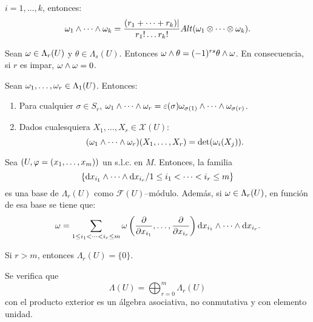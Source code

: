 \documentclass[cursovd_portada.tex]{subfiles}
\begin{document}
$i=1,\dots ,k$, entonces:
$$\omega_1\wedge\cdots\wedge\omega_k=\frac{(r_1+\cdots +r_k)|}{r_1!\dots r_k!}Alt(\omega_1\otimes\cdots\otimes\omega_k).$$
\begin{prop}
Sean $\omega\in\Lambda_r(U)$ y $\theta\in\Lambda_s(U)$. Entonces $\omega\wedge\theta=(-1)^{rs}\theta\wedge\omega$. En
consecuencia, si $r$ es impar, $\omega\wedge\omega=0$.
\end{prop}
\begin{prop}
Sean $\omega_1,\dots ,\omega_r\in\Lambda_1(U)$. Entonces:
\begin{enumerate}
\item Para cualquier $\sigma\in S_r$, $\omega_1\wedge\cdots\wedge\omega_r=\varepsilon(\sigma)\omega_{\sigma(1)}\wedge\cdots
\wedge\omega_{\sigma(r)}$.
\item Dados cualesquiera $X_1,\dots ,X_r\in\mathcal{X}(U)$:
$$(\omega_1\wedge\cdots\wedge\omega_r)(X_1,\dots ,X_r)={\rm det}(\omega_i(X_j)).$$
\end{enumerate}
\end{prop}
\begin{prop}
Sea $(U,\varphi=(x_1,\dots ,x_m))$ un s.l.c. en $M$. Entonces, la familia
$$\{{\rm d} x_{i_1}\wedge\cdots\wedge{\rm d} x_{i_r}/1\leq i_1<\cdots <i_r\leq m\}$$
es una base de $\Lambda_r(U)$ como $\mathcal{F}(U)$--m\'{o}dulo. Adem\'{a}s, si $\omega\in\Lambda_r(U)$, en funci\'{o}n de esa
base se tiene que:
$$\omega=\sum_{1\leq i_1 <\cdots <i_r\leq m}\omega\left(\displaystyle{\frac{\partial}{\partial x_{i_1}}},\dots
,\displaystyle{\frac{\partial}{\partial x_{i_r}}}\right){\rm d} x_{i_1}\wedge\cdots\wedge{\rm d} x_{i_r}.$$
\end{prop}
\begin{coro}
Si $r>m$, entonces $\Lambda_r(U)=\{0\}$.
\end{coro}
\begin{prop}
Se verifica que
$$\Lambda(U)=\bigoplus_{r=0}^m\Lambda_r(U)$$
con el producto exterior es un \'{a}lgebra asociativa, no conmutativa y con elemento unidad.
\end{prop}
\end{document}
